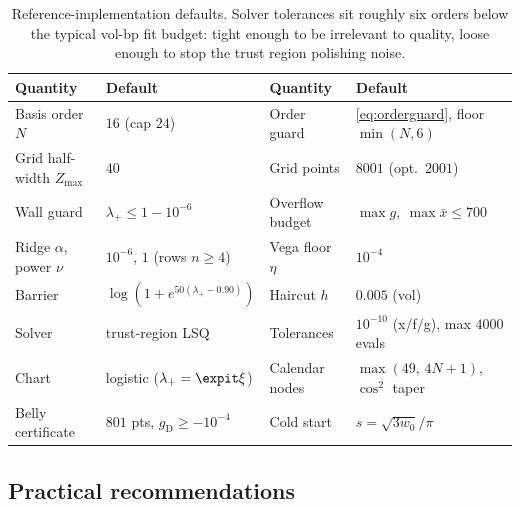\begin{table}[htbp]
\centering\small
\begin{tabular}{@{}llll@{}}
\toprule
Quantity & Default & Quantity & Default\\
\midrule
Basis order $N$ & $16$ (cap $24$) & Order guard & \eqref{eq:orderguard},
floor $\min(N,6)$\\
Grid half-width $Z_{\max}$ & $40$ & Grid points & $8001$ (opt.\ $2001$)\\
Wall guard & $\lambda_+\le1-10^{-6}$ & Overflow budget & $\max g,\ \max\bar
x\le700$\\
Ridge $\alpha$, power $\nu$ & $10^{-6}$, $1$ (rows $n\ge4$) & Vega floor
$\eta$ & $10^{-4}$\\
Barrier & $\log(1+e^{50(\lambda_+-0.90)})$ & Haircut $h$ & $0.005$ (vol)\\
Solver & trust-region LSQ & Tolerances & $10^{-10}$
(x/f/g), max $4000$ evals\\
Chart & logistic ($\lambda_+=\expit\xi$) & Calendar nodes &
$\max(49,\,4N+1)$, $\cos^2$ taper\\
Belly certificate & $801$ pts, $g_{\mathrm{D}}\ge-10^{-4}$ & Cold start &
$s=\sqrt{3w_0}/\pi$\\
\bottomrule
\end{tabular}
\caption{Reference-implementation defaults.  Solver tolerances sit
roughly six orders below the typical vol-bp fit budget: tight enough to
be irrelevant to quality, loose enough to stop the trust region
polishing noise.}
\label{tab:defaults}
\end{table}

\subsection{Practical recommendations}

